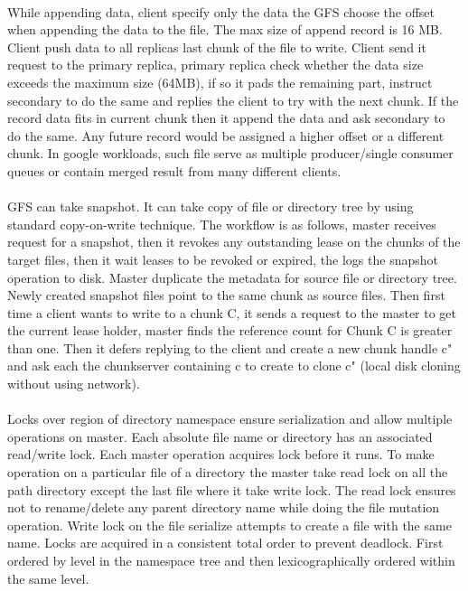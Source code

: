 \documentclass[8pt]{extarticle}
\begin{document}
	\paragraph{}
	While appending data, client specify only the data the GFS choose the offset when appending the data to the file. The max size of append record is 16 MB. Client push data to all replicas last chunk of the file to write. Client send it request to the primary replica, primary replica check whether the data size exceeds the maximum size (64MB), if so it pads the remaining part, instruct secondary to do the same and replies  the client to try with the next chunk. If the record data fits in current chunk then it append the data and ask secondary to do the same. Any future record would be assigned a higher offset or a different chunk. In google workloads, such file serve as multiple producer/single consumer queues or contain merged result from many different clients.
	
	\paragraph{}
	GFS can take snapshot. It can take copy of file or directory tree by using standard copy-on-write technique. The workflow is as follows, master receives request for a snapshot, then it revokes any outstanding lease on the chunks of the target files, then it wait leases to be revoked or expired, the logs the snapshot operation to disk. Master duplicate the metadata for source file or directory tree. Newly created snapshot files point to the same chunk as source files. Then first time a client wants to write to a chunk C, it sends a request to the master to get the current lease holder, master finds the reference count for Chunk C is greater than one. Then it defers replying to the client and create a new chunk handle c" and ask each the chunkserver containing c to create to clone c" (local disk cloning without using network).
	
	
	\paragraph{}
	Locks over region of directory namespace ensure serialization and allow multiple operations on master. Each absolute file name or directory has an associated read/write lock. Each master operation acquires lock before it runs. To make operation on a particular file of a directory the master take read lock on all the path directory except the last file where it take write lock. The read lock ensures not to rename/delete any parent directory name while doing the file mutation operation. Write lock on the file serialize attempts to create a file with the same name. Locks are acquired in a consistent total order to prevent deadlock. First ordered by level in the namespace tree and then lexicographically ordered within the same level.
	
\end{document}
